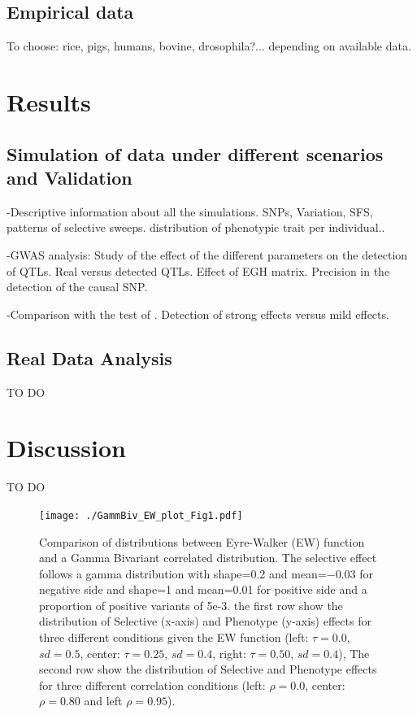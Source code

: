 \documentclass[a4paper,11pt]{article}
\newcommand{\beginsupplement}{%
        \setcounter{table}{0}
        \renewcommand{\thetable}{S\arabic{table}}%
        \setcounter{figure}{0}
        \renewcommand{\thefigure}{S\arabic{figure}}%
}
\begin{document}
\subsection{Empirical data}
To choose: rice, pigs, humans, bovine, drosophila?... depending on available data.

\section{Results}
\subsection{Simulation of data under different scenarios and Validation}
\noindent -Descriptive information about all the simulations. SNPs, Variation, SFS, patterns of selective sweeps. distribution of phenotypic trait per individual..\par
\noindent -GWAS analysis: Study of the effect of the different parameters on the detection of QTLs. Real versus detected QTLs. Effect of EGH matrix. Precision in the detection of the causal SNP.\par
\noindent -Comparison with the test of \citet{Beissinger:2018aa}. Detection of strong effects versus mild effects. \par

\subsection{Real Data Analysis}
TO DO

\section{Discussion}
TO DO




\newpage
\beginsupplement

\begin{figure}[h]
{\texttt{[image: ./GammBiv\_EW\_plot\_Fig1.pdf]}}
\caption{Comparison of distributions between Eyre-Walker (EW) function and a Gamma Bivariant correlated distribution. The selective effect follows a gamma distribution with shape=0.2 and mean=$-0.03$ for negative side and shape=1 and mean=0.01 for positive side and a proportion of positive variants of 5e-3. the first row show the distribution of Selective (x-axis) and Phenotype (y-axis) effects for three different conditions given the EW function (left: $\tau=0.0$, $sd=0.5$, center: $\tau=0.25$, $sd=0.4$, right: $\tau=0.50$, $sd=0.4$), The second row show the distribution of Selective and Phenotype effects for three different correlation conditions (left: $\rho=0.0$, center: $\rho=0.80$ and  left $\rho=0.95$). }
\label{comEWvsBiv}
\hspace*{-0.5cm}
\end{figure}
\end{document}
